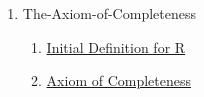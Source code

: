 \clearpage
\renewcommand{\notetitle}{Table of Contents}
\label{toc}
\begin{enumerate}

\item The-Axiom-of-Completeness
\begin{enumerate}
\item \hyperref[202501180703]{Initial Definition for R}
\item \hyperref[202501180727]{Axiom of Completeness}
\end{enumerate}
\end{enumerate}

\newpage
